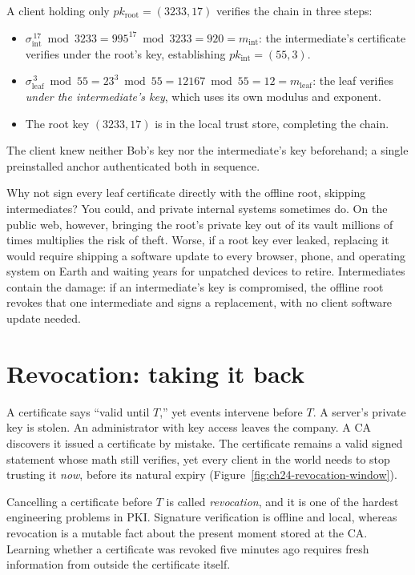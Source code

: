 A client holding only $pk_{\mathrm{root}} = (3233, 17)$ verifies the chain in three steps:
\begin{itemize}
\item $\sigma_{\mathrm{int}}^{\,17} \bmod 3233 = 995^{17} \bmod 3233 = 920 = m_{\mathrm{int}}$: the intermediate's certificate verifies under the root's key, establishing $pk_{\mathrm{int}} = (55,3)$.
\item $\sigma_{\mathrm{leaf}}^{\,3} \bmod 55 = 23^{3} \bmod 55 = 12167 \bmod 55 = 12 = m_{\mathrm{leaf}}$: the leaf verifies \emph{under the intermediate's key}, which uses its own modulus and exponent.
\item The root key $(3233,17)$ is in the local trust store, completing the chain.
\end{itemize}
The client knew neither Bob's key nor the intermediate's key beforehand; a single preinstalled anchor authenticated both in sequence.

\begin{walkbox}
Why not sign every leaf certificate directly with the offline root, skipping intermediates? You could, and private internal systems sometimes do. On the public web, however, bringing the root's private key out of its vault millions of times multiplies the risk of theft. Worse, if a root key ever leaked, replacing it would require shipping a software update to every browser, phone, and operating system on Earth and waiting years for unpatched devices to retire. Intermediates contain the damage: if an intermediate's key is compromised, the offline root revokes that one intermediate and signs a replacement, with no client software update needed.
\end{walkbox}

\section{Revocation: taking it back}
\label{ch24:revocation}

A certificate says ``valid until $T$,'' yet events intervene before $T$. A server's private key is stolen. An administrator with key access leaves the company. A CA discovers it issued a certificate by mistake. The certificate remains a valid signed statement whose math still verifies, yet every client in the world needs to stop trusting it \emph{now}, before its natural expiry (Figure~\ref{fig:ch24-revocation-window}).

Cancelling a certificate before $T$ is called \emph{revocation}, and it is one of the hardest engineering problems in PKI. Signature verification is offline and local, whereas revocation is a mutable fact about the present moment stored at the CA. Learning whether a certificate was revoked five minutes ago requires fresh information from outside the certificate itself.

